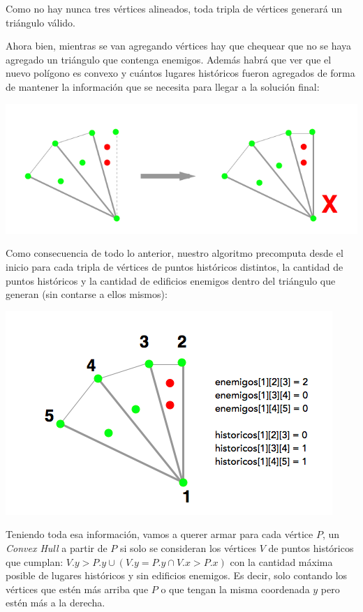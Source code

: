 Como no hay nunca tres vértices alineados, toda tripla de vértices generará un triángulo válido.

Ahora bien, mientras se van agregando vértices hay que chequear que no se haya agregado un
triángulo que contenga enemigos. Además habrá que ver que el nuevo polígono es convexo y cuántos lugares
históricos fueron agregados de forma de mantener la información que se necesita para llegar a la solución final:

\includegraphics[scale=0.5]{img/ej32.png}

Como consecuencia de todo lo anterior, nuestro algoritmo precomputa desde el inicio para cada tripla de
vértices de puntos históricos distintos, la cantidad de puntos históricos y la cantidad de edificios enemigos dentro del
triángulo que generan (sin contarse a ellos mismos):

\includegraphics[scale=0.5]{img/ej33.png}

Teniendo toda esa información, vamos a querer armar para cada vértice $P$, un \textit{Convex Hull} a partir de $P$
si solo se consideran los vértices $V$ de puntos históricos que cumplan: $V.y > P.y \cup (V.y = P.y \cap V.x > P.x)$ con 
la cantidad máxima posible de lugares históricos y sin edificios enemigos. 
Es decir, solo contando los vértices que estén más arriba que $P$ o que tengan la misma coordenada $y$ pero estén más a
la derecha.

